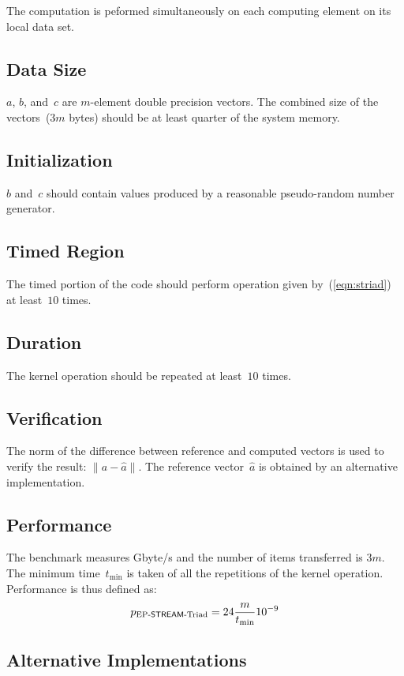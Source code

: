 \documentclass[twocolumn,draft]{article}
\newcommand{\STREAM}{\textsf{STREAM}\xspace}
\begin{document}
The computation is peformed simultaneously on each computing element on its
local data set.

\subsection{Data Size}
$a$, $b$, and~$c$ are $m$-element double precision vectors. The combined size
of the vectors~($3m$ bytes) should be at least quarter of the system memory.

\subsection{Initialization}
$b$ and~$c$ should contain values produced by a reasonable pseudo-random number
generator.

\subsection{Timed Region}
The timed portion of the code should perform operation given
by~(\ref{eqn:striad}) at least~$10$ times.

\subsection{Duration}
The kernel operation should be repeated at least~$10$ times.

\subsection{Verification}
The norm of the difference between reference and computed vectors is used to
verify the result: $\|a-\hat{a}\|$. The reference vector~$\hat{a}$ is obtained
by an alternative implementation.

\subsection{Performance}
The benchmark measures Gbyte/s and the number of items transferred is $3m$. The
minimum time~$t_{\min}$ is taken of all the repetitions of the kernel
operation. Performance is thus defined as:
\begin{equation}
  p_{\textrm{\scriptsize{}EP-\STREAM{}-Triad}} = 24\frac{m}{t_{\min}}10^{-9}
\end{equation}

\subsection{Alternative Implementations}
\end{document}
